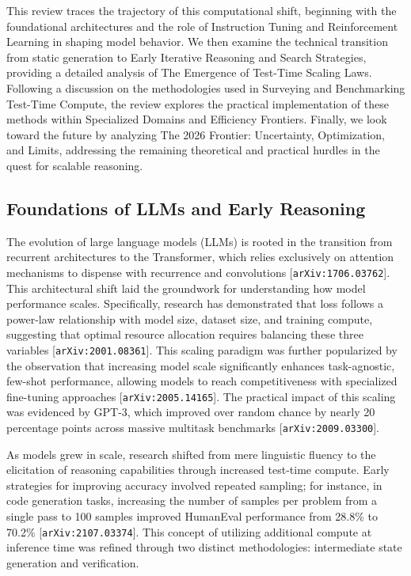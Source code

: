 \documentclass[11pt]{article}
\begin{document}
This review traces the trajectory of this computational shift, beginning with the foundational architectures and the role of Instruction Tuning and Reinforcement Learning in shaping model behavior. We then examine the technical transition from static generation to Early Iterative Reasoning and Search Strategies, providing a detailed analysis of The Emergence of Test-Time Scaling Laws. Following a discussion on the methodologies used in Surveying and Benchmarking Test-Time Compute, the review explores the practical implementation of these methods within Specialized Domains and Efficiency Frontiers. Finally, we look toward the future by analyzing The 2026 Frontier: Uncertainty, Optimization, and Limits, addressing the remaining theoretical and practical hurdles in the quest for scalable reasoning.

\subsection{Foundations of LLMs and Early Reasoning}

The evolution of large language models (LLMs) is rooted in the transition from recurrent architectures to the Transformer, which relies exclusively on attention mechanisms to dispense with recurrence and convolutions [\texttt{arXiv:1706.03762}]. This architectural shift laid the groundwork for understanding how model performance scales. Specifically, research has demonstrated that loss follows a power-law relationship with model size, dataset size, and training compute, suggesting that optimal resource allocation requires balancing these three variables [\texttt{arXiv:2001.08361}]. This scaling paradigm was further popularized by the observation that increasing model scale significantly enhances task-agnostic, few-shot performance, allowing models to reach competitiveness with specialized fine-tuning approaches [\texttt{arXiv:2005.14165}]. The practical impact of this scaling was evidenced by GPT-3, which improved over random chance by nearly 20 percentage points across massive multitask benchmarks [\texttt{arXiv:2009.03300}].

As models grew in scale, research shifted from mere linguistic fluency to the elicitation of reasoning capabilities through increased test-time compute. Early strategies for improving accuracy involved repeated sampling; for instance, in code generation tasks, increasing the number of samples per problem from a single pass to 100 samples improved HumanEval performance from 28.8\% to 70.2\% [\texttt{arXiv:2107.03374}]. This concept of utilizing additional compute at inference time was refined through two distinct methodologies: intermediate state generation and verification.
\end{document}
